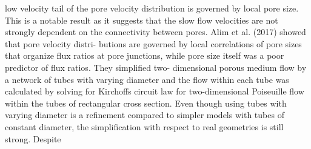 low velocity tail of the pore velocity distribution is governed by local pore size. This is
a notable result as it suggests that the slow flow velocities are not strongly dependent
on the connectivity between pores. Alim et al. (2017) showed that pore velocity distri- butions are governed by local correlations of pore sizes that organize flux ratios at pore junctions, while pore size itself was a poor predictor of flux ratios. They simplified two- dimensional porous medium flow by a network of tubes with varying diameter and the
flow within each tube was calculated by solving for Kirchoffs circuit law for two-dimensional Poiseuille flow within the tubes of rectangular cross section. Even though using tubes
with varying diameter is a refinement compared to simpler models with tubes of constant diameter, the simplification with respect to real geometries is still strong. Despite

